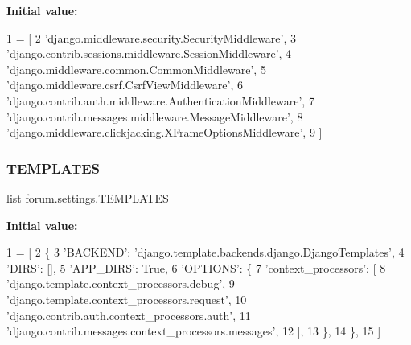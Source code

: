 {\bfseries Initial value\+:}
\begin{DoxyCode}
1 =  [
2     \textcolor{stringliteral}{'django.middleware.security.SecurityMiddleware'},
3     \textcolor{stringliteral}{'django.contrib.sessions.middleware.SessionMiddleware'},
4     \textcolor{stringliteral}{'django.middleware.common.CommonMiddleware'},
5     \textcolor{stringliteral}{'django.middleware.csrf.CsrfViewMiddleware'},
6     \textcolor{stringliteral}{'django.contrib.auth.middleware.AuthenticationMiddleware'},
7     \textcolor{stringliteral}{'django.contrib.messages.middleware.MessageMiddleware'},
8     \textcolor{stringliteral}{'django.middleware.clickjacking.XFrameOptionsMiddleware'},
9 ]
\end{DoxyCode}
\mbox{\label{namespaceforum_1_1settings_ad0987d426b663dfef071e02e9579f7bb}} 
\subsubsection{\texorpdfstring{T\+E\+M\+P\+L\+A\+T\+ES}{TEMPLATES}}
{\footnotesize\ttfamily list forum.\+settings.\+T\+E\+M\+P\+L\+A\+T\+ES}

{\bfseries Initial value\+:}
\begin{DoxyCode}
1 =  [
2     \{
3         \textcolor{stringliteral}{'BACKEND'}: \textcolor{stringliteral}{'django.template.backends.django.DjangoTemplates'},
4         \textcolor{stringliteral}{'DIRS'}: [],
5         \textcolor{stringliteral}{'APP\_DIRS'}: \textcolor{keyword}{True},
6         \textcolor{stringliteral}{'OPTIONS'}: \{
7             \textcolor{stringliteral}{'context\_processors'}: [
8                 \textcolor{stringliteral}{'django.template.context\_processors.debug'},
9                 \textcolor{stringliteral}{'django.template.context\_processors.request'},
10                 \textcolor{stringliteral}{'django.contrib.auth.context\_processors.auth'},
11                 \textcolor{stringliteral}{'django.contrib.messages.context\_processors.messages'},
12             ],
13         \},
14     \},
15 ]
\end{DoxyCode}
